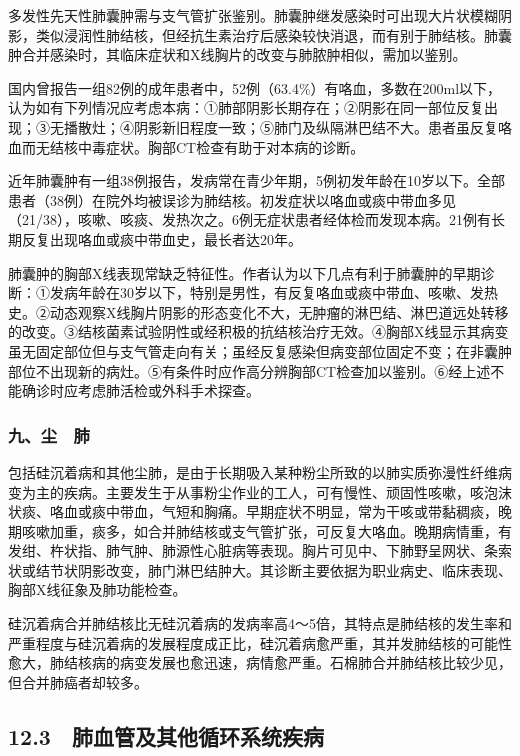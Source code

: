 多发性先天性肺囊肿需与支气管扩张鉴别。肺囊肿继发感染时可出现大片状模糊阴影，类似浸润性肺结核，但经抗生素治疗后感染较快消退，而有别于肺结核。肺囊肿合并感染时，其临床症状和X线胸片的改变与肺脓肿相似，需加以鉴别。

国内曾报告一组82例的成年患者中，52例（63.4\%）有咯血，多数在200ml以下，认为如有下列情况应考虑本病：①肺部阴影长期存在；②阴影在同一部位反复出现；③无播散灶；④阴影新旧程度一致；⑤肺门及纵隔淋巴结不大。患者虽反复咯血而无结核中毒症状。胸部CT检查有助于对本病的诊断。

近年肺囊肿有一组38例报告，发病常在青少年期，5例初发年龄在10岁以下。全部患者（38例）在院外均被误诊为肺结核。初发症状以咯血或痰中带血多见（21/38），咳嗽、咳痰、发热次之。6例无症状患者经体检而发现本病。21例有长期反复出现咯血或痰中带血史，最长者达20年。

肺囊肿的胸部X线表现常缺乏特征性。作者认为以下几点有利于肺囊肿的早期诊断：①发病年龄在30岁以下，特别是男性，有反复咯血或痰中带血、咳嗽、发热史。②动态观察X线胸片阴影的形态变化不大，无肿瘤的淋巴结、淋巴道远处转移的改变。③结核菌素试验阴性或经积极的抗结核治疗无效。④胸部X线显示其病变虽无固定部位但与支气管走向有关；虽经反复感染但病变部位固定不变；在非囊肿部位不出现新的病灶。⑤有条件时应作高分辨胸部CT检查加以鉴别。⑥经上述不能确诊时应考虑肺活检或外科手术探查。

\subsubsection{九、尘　肺}

包括硅沉着病和其他尘肺，是由于长期吸入某种粉尘所致的以肺实质弥漫性纤维病变为主的疾病。主要发生于从事粉尘作业的工人，可有慢性、顽固性咳嗽，咳泡沫状痰、咯血或痰中带血，气短和胸痛。早期症状不明显，常为干咳或带黏稠痰，晚期咳嗽加重，痰多，如合并肺结核或支气管扩张，可反复大咯血。晚期病情重，有发绀、杵状指、肺气肿、肺源性心脏病等表现。胸片可见中、下肺野呈网状、条索状或结节状阴影改变，肺门淋巴结肿大。其诊断主要依据为职业病史、临床表现、胸部X线征象及肺功能检查。

硅沉着病合并肺结核比无硅沉着病的发病率高4～5倍，其特点是肺结核的发生率和严重程度与硅沉着病的发展程度成正比，硅沉着病愈严重，其并发肺结核的可能性愈大，肺结核病的病变发展也愈迅速，病情愈严重。石棉肺合并肺结核比较少见，但合并肺癌者却较多。

\protect\hypertarget{text00059.html}{}{}

\subsection{12.3　肺血管及其他循环系统疾病}

